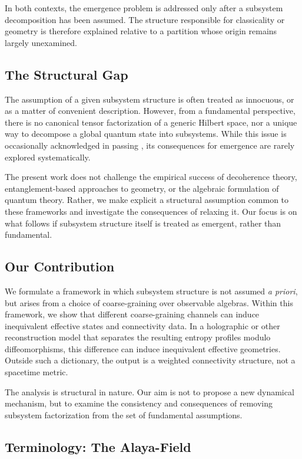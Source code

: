 \documentclass[12pt,a4paper,openany]{book}
\begin{document}
In both contexts, the emergence problem is addressed only after a subsystem decomposition has been assumed.
The structure responsible for classicality or geometry is therefore explained relative to a partition whose origin remains largely unexamined.

\subsection{The Structural Gap}

The assumption of a given subsystem structure is often treated as innocuous, or as a matter of convenient description. 
However, from a fundamental perspective, there is no canonical tensor factorization of a generic Hilbert space, nor a unique way to decompose a global quantum state into subsystems.
While this issue is occasionally acknowledged in passing \cite{Zanardi2004,Viola2004}, its consequences for emergence are rarely explored systematically.

The present work does not challenge the empirical success of decoherence theory, entanglement-based approaches to geometry, or the algebraic formulation of quantum theory.
Rather, we make explicit a structural assumption common to these frameworks and investigate the consequences of relaxing it.
Our focus is on what follows if subsystem structure itself is treated as emergent, rather than fundamental.

\subsection{Our Contribution}

We formulate a framework in which subsystem structure is not assumed \emph{a priori}, but arises from a choice of coarse-graining over observable algebras.
Within this framework, we show that different coarse-graining channels can induce inequivalent effective states and connectivity data.  In a holographic or other reconstruction model that separates the resulting entropy profiles modulo diffeomorphisms, this difference can induce inequivalent effective geometries.  Outside such a dictionary, the output is a weighted connectivity structure, not a spacetime metric.

The analysis is structural in nature.
Our aim is not to propose a new dynamical mechanism, but to examine the consistency and consequences of removing subsystem factorization from the set of fundamental assumptions.

\subsection{Terminology: The Alaya-Field}
\end{document}
